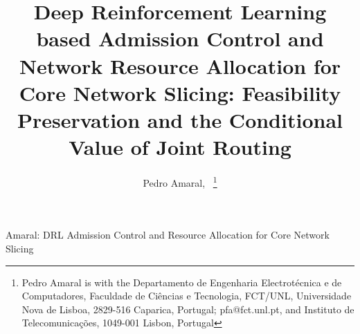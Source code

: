 \documentclass[10pt,journal,comsoc]{IEEEtran}
\begin{document}
\title{Deep Reinforcement Learning based Admission Control and Network
Resource Allocation for Core Network Slicing: Feasibility Preservation
and the Conditional Value of Joint Routing}

\author{Pedro Amaral,~
\thanks{Pedro Amaral is with the Departamento de Engenharia Electrot\'ecnica e de Computadores, Faculdade de Ci\^encias e Tecnologia,
FCT/UNL, Universidade Nova de Lisboa, 2829-516 Caparica, Portugal; pfa@fct.unl.pt, and Instituto de Telecomunica\c{c}\~oes, 1049-001 Lisbon, Portugal}%
}

%
{Amaral: DRL Admission Control and Resource Allocation for Core Network Slicing}


\maketitle
\end{document}
